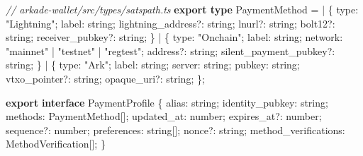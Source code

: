 \documentclass[
]{article}
\newenvironment{Shaded}{}{}
\newcommand{\CommentTok}[1]{\textcolor[rgb]{0.38,0.63,0.69}{\textit{#1}}}
\newcommand{\DataTypeTok}[1]{\textcolor[rgb]{0.56,0.13,0.00}{#1}}
\newcommand{\ImportTok}[1]{\textcolor[rgb]{0.00,0.50,0.00}{\textbf{#1}}}
\newcommand{\KeywordTok}[1]{\textcolor[rgb]{0.00,0.44,0.13}{\textbf{#1}}}
\newcommand{\NormalTok}[1]{#1}
\newcommand{\OperatorTok}[1]{\textcolor[rgb]{0.40,0.40,0.40}{#1}}
\newcommand{\StringTok}[1]{\textcolor[rgb]{0.25,0.44,0.63}{#1}}
\begin{document}
\begin{Shaded}
\begin{Highlighting}[]
\CommentTok{// arkade{-}wallet/src/types/satspath.ts}
\ImportTok{export type}\NormalTok{ PaymentMethod }\OperatorTok{=}
  \OperatorTok{|}\NormalTok{ \{}
\NormalTok{      type}\OperatorTok{:} \StringTok{"Lightning"}\OperatorTok{;}
\NormalTok{      label}\OperatorTok{:} \DataTypeTok{string}\OperatorTok{;}
\NormalTok{      lightning\_address}\OperatorTok{?:} \DataTypeTok{string}\OperatorTok{;}
\NormalTok{      lnurl}\OperatorTok{?:} \DataTypeTok{string}\OperatorTok{;}
\NormalTok{      bolt12}\OperatorTok{?:} \DataTypeTok{string}\OperatorTok{;}
\NormalTok{      receiver\_pubkey}\OperatorTok{?:} \DataTypeTok{string}\OperatorTok{;}
\NormalTok{    \}}
  \OperatorTok{|}\NormalTok{ \{}
\NormalTok{      type}\OperatorTok{:} \StringTok{"Onchain"}\OperatorTok{;}
\NormalTok{      label}\OperatorTok{:} \DataTypeTok{string}\OperatorTok{;}
\NormalTok{      network}\OperatorTok{:} \StringTok{"mainnet"} \OperatorTok{|} \StringTok{"testnet"} \OperatorTok{|} \StringTok{"regtest"}\OperatorTok{;}
\NormalTok{      address}\OperatorTok{?:} \DataTypeTok{string}\OperatorTok{;}
\NormalTok{      silent\_payment\_pubkey}\OperatorTok{?:} \DataTypeTok{string}\OperatorTok{;}
\NormalTok{    \}}
  \OperatorTok{|}\NormalTok{ \{}
\NormalTok{      type}\OperatorTok{:} \StringTok{"Ark"}\OperatorTok{;}
\NormalTok{      label}\OperatorTok{:} \DataTypeTok{string}\OperatorTok{;}
\NormalTok{      server}\OperatorTok{:} \DataTypeTok{string}\OperatorTok{;}
\NormalTok{      pubkey}\OperatorTok{:} \DataTypeTok{string}\OperatorTok{;}
\NormalTok{      vtxo\_pointer}\OperatorTok{?:} \DataTypeTok{string}\OperatorTok{;}
\NormalTok{      opaque\_uri}\OperatorTok{?:} \DataTypeTok{string}\OperatorTok{;}
\NormalTok{    \}}\OperatorTok{;}

\ImportTok{export} \KeywordTok{interface}\NormalTok{ PaymentProfile \{}
\NormalTok{  alias}\OperatorTok{:} \DataTypeTok{string}\OperatorTok{;}
\NormalTok{  identity\_pubkey}\OperatorTok{:} \DataTypeTok{string}\OperatorTok{;}
\NormalTok{  methods}\OperatorTok{:}\NormalTok{ PaymentMethod[]}\OperatorTok{;}
\NormalTok{  updated\_at}\OperatorTok{:} \DataTypeTok{number}\OperatorTok{;}
\NormalTok{  expires\_at}\OperatorTok{?:} \DataTypeTok{number}\OperatorTok{;}
\NormalTok{  sequence}\OperatorTok{?:} \DataTypeTok{number}\OperatorTok{;}
\NormalTok{  preferences}\OperatorTok{:} \DataTypeTok{string}\NormalTok{[]}\OperatorTok{;}
\NormalTok{  nonce}\OperatorTok{?:} \DataTypeTok{string}\OperatorTok{;}
\NormalTok{  method\_verifications}\OperatorTok{:}\NormalTok{ MethodVerification[]}\OperatorTok{;}
\NormalTok{\}}


\end{Highlighting}
\end{Shaded}
\end{document}
